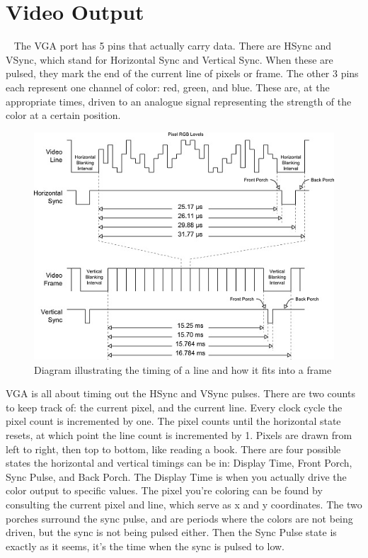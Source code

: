 \documentclass[]{article}
\begin{document}
\section{Video Output}\
\label{vidoutput}
The VGA port has 5 pins that actually carry data.  There are HSync and VSync, which stand for Horizontal Sync and Vertical Sync.  When these are pulsed, they mark the end of the current line of pixels or frame.
The other 3 pins each represent one channel of color: red, green, and blue.  These are, at the appropriate times, driven to an analogue signal representing the strength of the color at a certain position.
\begin{figure}[H]\centering
    \includegraphics[width=0.75\linewidth]{figures/VGA_Timing_Diagram.jpg}
    \caption{Diagram illustrating the timing of a line and how it fits into a frame \cite{vgaTimingDiagram}} 
    \label{fig:vgaTimingFigure}
\end{figure}
VGA is all about timing out the HSync and VSync pulses.  There are two counts to keep track of: the current pixel, and the current line.  Every clock cycle the pixel count is incremented by one.  The pixel counts until the horizontal state resets, at which point the line count is incremented by 1.  Pixels are drawn from left to right, then top to bottom, like reading a book.
There are four possible states the horizontal and vertical timings can be in: Display Time, Front Porch, Sync Pulse, and Back Porch.  The Display Time is when you actually drive the color output to specific values.  The pixel you're coloring can be found by consulting the current pixel and line, which serve as x and y coordinates.  The two porches surround the sync pulse, and are periods where the colors are not being driven, but the sync is not being pulsed either.  Then the Sync Pulse state is exactly as it seems, it's the time when the sync is pulsed to low.
\end{document}
